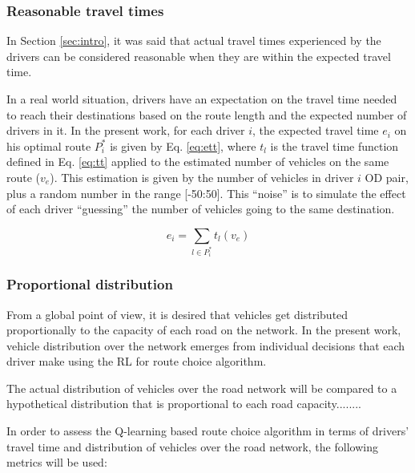 \documentclass[12pt]{article}
\newcommand{\optRoute}[1]{\ensuremath{P_#1^*}}	%
\newcommand{\travTime}{\ensuremath{t_l}} 	%
\newcommand{\ett}[1]{\ensuremath{e_#1}}		%
\newcommand{\expVeh}{\ensuremath{v_e}}		%
\begin{document}
\subsubsection{Reasonable travel times}
In Section \ref{sec:intro}, it was said that actual travel times experienced by the drivers can be considered reasonable when they are within the expected travel time.

In a real world situation, drivers have an expectation on the travel time needed to reach their destinations based on the route length and the expected number of drivers in it. In the present work, for each driver $i$, the expected travel time $\ett{i}$ on his optimal route \optRoute{i} is given by Eq. \eqref{eq:ett}, where $\travTime$ is the travel time function defined in Eq. \eqref{eq:tt} applied to the estimated number of vehicles on the same route ($\expVeh$). This estimation is given by the number of vehicles in driver $i$ OD pair, plus a random number in the range [-50:50]. This ``noise'' is to simulate the effect of each driver ``guessing'' the number of vehicles going to the same destination.

\begin{equation}
\label{eq:ett}
\ett{i} = \sum_{l \in \optRoute{i}}\travTime(\expVeh)
\end{equation}


\subsubsection{Proportional distribution}

From a global point of view, it is desired that vehicles get distributed proportionally to the capacity of each road on the network. In the present work, vehicle distribution over the network emerges from individual decisions that each driver make using the RL for route choice algorithm. 

The actual distribution of vehicles over the road network will be compared to a hypothetical distribution that is proportional to each road capacity........%

In order to assess the Q-learning based route choice algorithm in terms of drivers' travel time and distribution of vehicles over the road network, the following metrics will be used: 
\end{document}
